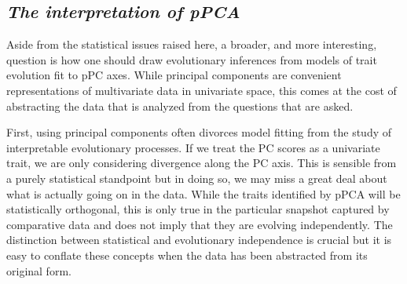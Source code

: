 \documentclass[a4paper,12pt]{article}
\begin{document}

\subsection{\emph{The interpretation of pPCA}}

Aside from the statistical issues raised here, a broader, and more interesting, question is how one should draw evolutionary inferences from models of trait evolution fit to pPC axes. While principal components are convenient representations of multivariate data in univariate space, this comes at the cost of abstracting the data that is analyzed from the questions that are asked. 

First, using principal components often divorces model fitting from the study of interpretable evolutionary processes. If we treat the PC scores as a univariate trait, we are only considering divergence along the PC axis. This is sensible from a purely statistical standpoint but in doing so, we may miss a great deal about what is actually going on in the data. While the traits identified by pPCA will be statistically orthogonal, this is only true in the particular snapshot captured by comparative data and does not imply that they are evolving independently. The distinction between statistical and evolutionary independence is crucial \citep{HansenHoule2008} but it is easy to conflate these concepts when the data has been abstracted from its original form. 
\end{document}

